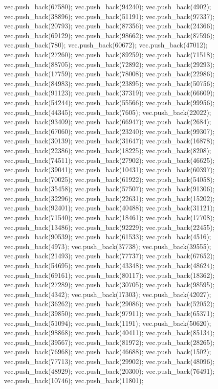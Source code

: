 vec.push_back(67580);
vec.push_back(94240);
vec.push_back(4902);
vec.push_back(38896);
vec.push_back(51191);
vec.push_back(97337);
vec.push_back(20793);
vec.push_back(87356);
vec.push_back(24366);
vec.push_back(69129);
vec.push_back(98662);
vec.push_back(87596);
vec.push_back(780);
vec.push_back(60672);
vec.push_back(47012);
vec.push_back(27260);
vec.push_back(89259);
vec.push_back(71518);
vec.push_back(88705);
vec.push_back(72892);
vec.push_back(29293);
vec.push_back(17759);
vec.push_back(78008);
vec.push_back(22986);
vec.push_back(84983);
vec.push_back(23895);
vec.push_back(50756);
vec.push_back(91123);
vec.push_back(37319);
vec.push_back(66609);
vec.push_back(54244);
vec.push_back(55566);
vec.push_back(99956);
vec.push_back(44345);
vec.push_back(7605);
vec.push_back(22022);
vec.push_back(93409);
vec.push_back(66947);
vec.push_back(2684);
vec.push_back(67060);
vec.push_back(23240);
vec.push_back(99307);
vec.push_back(30139);
vec.push_back(31647);
vec.push_back(16878);
vec.push_back(22386);
vec.push_back(18225);
vec.push_back(8208);
vec.push_back(74511);
vec.push_back(27902);
vec.push_back(46625);
vec.push_back(39041);
vec.push_back(10431);
vec.push_back(60397);
vec.push_back(70025);
vec.push_back(61922);
vec.push_back(54058);
vec.push_back(35458);
vec.push_back(57507);
vec.push_back(91306);
vec.push_back(32296);
vec.push_back(22631);
vec.push_back(15202);
vec.push_back(92401);
vec.push_back(40488);
vec.push_back(31121);
vec.push_back(71540);
vec.push_back(18461);
vec.push_back(17708);
vec.push_back(13486);
vec.push_back(92229);
vec.push_back(22455);
vec.push_back(90539);
vec.push_back(61533);
vec.push_back(4516);
vec.push_back(4973);
vec.push_back(37738);
vec.push_back(39555);
vec.push_back(21493);
vec.push_back(77737);
vec.push_back(67652);
vec.push_back(54695);
vec.push_back(43348);
vec.push_back(48624);
vec.push_back(69161);
vec.push_back(80117);
vec.push_back(18362);
vec.push_back(27289);
vec.push_back(30705);
vec.push_back(98595);
vec.push_back(4342);
vec.push_back(17303);
vec.push_back(42027);
vec.push_back(36262);
vec.push_back(29086);
vec.push_back(52052);
vec.push_back(39850);
vec.push_back(97911);
vec.push_back(65371);
vec.push_back(51094);
vec.push_back(1191);
vec.push_back(50620);
vec.push_back(98868);
vec.push_back(40411);
vec.push_back(85134);
vec.push_back(39567);
vec.push_back(81972);
vec.push_back(28265);
vec.push_back(76968);
vec.push_back(46688);
vec.push_back(1502);
vec.push_back(77713);
vec.push_back(29902);
vec.push_back(48096);
vec.push_back(48929);
vec.push_back(20300);
vec.push_back(76491);
vec.push_back(10746);
vec.push_back(11801);
